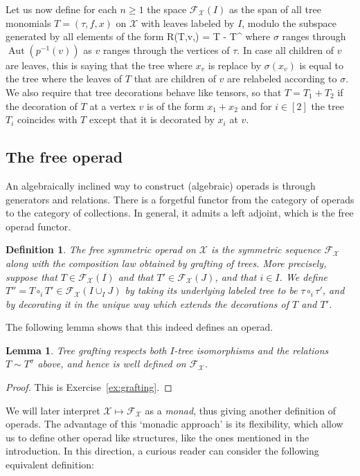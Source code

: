 \documentclass[fleqn, a4paper, twoside]{article}
\makeatletter
\newcommand{\0}{\langle 0\rangle}
\newcommand{\XX}{\mathcal{X}}
\newcommand{\FF}{\mathcal{F}}
\let\[\@undefined
\DeclareRobustCommand{\[}{\begin{equation}}%
\let\]\@undefined
\DeclareRobustCommand{\]}{\end{equation}}%
\theoremstyle{mytheorem}
\newtheorem{lemma}[theorem]{Lemma}
\theoremstyle{introthm}
\theoremstyle{mydefinition}
\newtheorem{definition}[theorem]{Definition}
\theoremstyle{mydefinition2}
\theoremstyle{plain} %
\newcommand{\?}{\,?\,}
\newcommand{\Aut}{\operatorname{Aut}}
\theoremstyle{mytheorem}
\theoremstyle{plain} %
\makeatother
\begin{document}
Let us now define for each $n\geqslant 1$ the
space $\FF_\XX(I)$ as the span of all tree monomials
$T = (\tau,f,x)$ on $\XX$ with leaves labeled by $I$,
modulo the subspace generated by all elements of the form
\[ R(T,v,\sigma) = T - T^\sigma \]
where $\sigma$ ranges through $\Aut(p^{-1}(v))$ as
$v$ ranges through the vertices of $\tau$. In case
all children of $v$ are leaves, this is saying that
the tree where $x_v$ is replace by $\sigma(x_v)$
is equal to the tree where the leaves of $T$ that are
children of $v$ are relabeled according to $\sigma$.
We also require that tree decorations behave like
tensors, so that $T = T_1+T_2$ if the decoration
of $T$ at a vertex $v$ is of the form $x_1 + x_2$
and for $i\in [2]$ the tree $T_i$ coincides with
$T$ except that it is decorated by $x_i$ at $v$.



\subsection{The free operad}
An algebraically inclined way to construct
(algebraic) operads is through generators and
relations. There is a forgetful functor
from the category of operads to the category
of collections. In general, it admits a left
adjoint, which is the free operad functor.

\begin{definition}
The \emph{free symmetric operad} on $\XX$ is the
symmetric sequence $\FF_\XX$ along with the composition
law obtained by grafting of trees. More precisely,
suppose that $T\in \FF_\XX(I)$ and that $T'\in\FF_\XX(J)$,
and that $i\in I$. We define $T'' =T\circ_i T' \in 
\FF_\XX(I\cup_I J)$ by taking its underlying labeled
tree to be $\tau\circ_i \tau'$, and by decorating it
in the unique way which extends the decorations of 
$T$ and $T'$.
\end{definition}

The following lemma shows that this indeed defines an operad.

\begin{lemma}
Tree grafting respects both $I$-tree 
isomorphisms and the relations $T\sim T^\sigma$
above, and hence is well defined on $\FF_\XX$.
\end{lemma}

\begin{proof}
This is Exercise~\ref{ex:grafting}.
\end{proof}

 We will later
interpret $\XX\longmapsto \FF_\XX$ as a \emph{monad},
thus giving another definition of operads. The
advantage of this `monadic approach' is its 
flexibility, which allow us to define other
operad like structures, like the ones 
mentioned in the introduction.
In this direction, a curious reader 
can consider the following 
equivalent definition:
\end{document}
